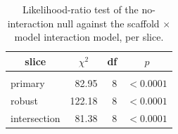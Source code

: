\documentclass[10pt]{article} %
\begin{document}
    \begin{table}[h]
        \caption{Likelihood-ratio test of the no-interaction null against the scaffold $\times$ model interaction model, per slice.}
    \label{tab:glmm_lrt}
    \begin{center}
    \small
    \begin{tabular}{lrrr}
        \multicolumn{1}{c}{\bf slice} & \multicolumn{1}{c}{\bf $\chi^2$} & \multicolumn{1}{c}{\bf df} & \multicolumn{1}{c}{\bf $p$} \\
        \hline \\
        primary & 82.95 & 8 & $<0.0001$ \\
        robust & 122.18 & 8 & $<0.0001$ \\
        intersection & 81.38 & 8 & $<0.0001$ \\
    \end{tabular}
    \end{center}
    \end{table}
\end{document}
